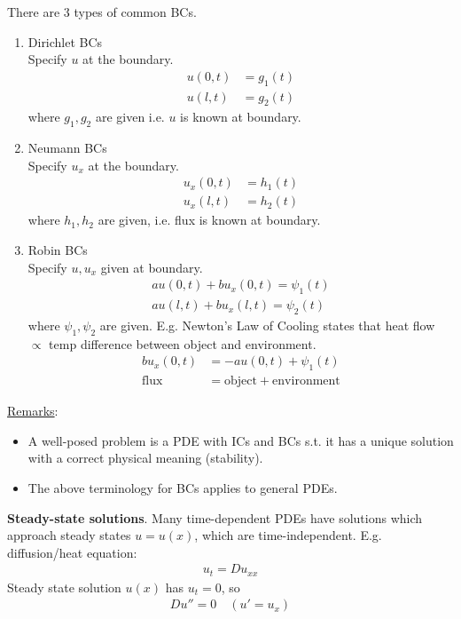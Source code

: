 \documentclass[12pt, letterpaper]{article}
\begin{document}
There are 3 types of common BCs.
\begin{enumerate}
    \item Dirichlet BCs \\
    Specify $u$ at the boundary.
    \begin{align*}
        u(0,t) &= g_1(t) \\
        u(l,t) &= g_2(t)
    \end{align*}
    where $g_1,g_2$ are given i.e. $u$ is known at boundary.
    \item Neumann BCs \\
    Specify $u_x$ at the boundary.
    \begin{align*}
        u_x(0,t) &= h_1(t) \\
        u_x(l,t) &= h_2(t)
    \end{align*}
    where $h_1, h_2$ are given, i.e. flux is known at boundary.
    \item Robin BCs \\
    Specify $u,u_x$ given at boundary.
    \begin{align*}
        au(0,t) + bu_x(0,t) = \psi_1(t) \\
        au(l,t) + bu_x(l,t) = \psi_2(t) 
    \end{align*}
    where $\psi_1, \psi_2$ are given. E.g. Newton's Law of Cooling states that heat flow 
    $\propto$ temp difference between object and environment.
    \begin{align*}
        bu_x(0,t) &= - au(0,t) + \psi_1(t) \\
        \text{flux} &= \text{object} + \text{environment}
    \end{align*}
\end{enumerate}
\underline{Remarks}:
\begin{itemize}
    \item A well-posed problem is a PDE with ICs and BCs s.t. it has a unique solution with 
    a correct physical meaning (stability).
    \item The above terminology for BCs applies to general PDEs.
\end{itemize}
\textbf{Steady-state solutions}. Many time-dependent PDEs have solutions which approach steady 
states $u = u(x)$, which are time-independent. E.g. diffusion/heat equation:
\begin{align*}
    u_t = Du_{xx}
\end{align*}
Steady state solution $u(x)$ has $u_t = 0$, so 
\begin{align*}
    Du'' = 0 \quad (u' = u_x)
\end{align*}
\end{document}
